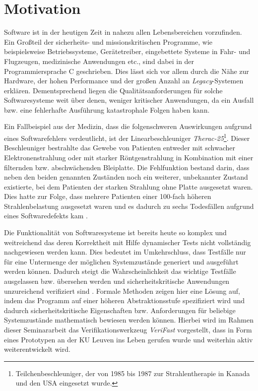 \section{Motivation}

Software ist in der heutigen Zeit in nahezu allen Lebensbereichen vorzufinden. Ein Großteil der sicherheits- und missionskritischen Programme, wie beispielsweise Betriebssysteme, Gerätetreiber, eingebettete Systeme in Fahr- und Flugzeugen, medizinische Anwendungen etc.,  sind dabei in der Programmiersprache C geschrieben. Dies lässt sich vor allem durch die Nähe zur Hardware, der hohen Performance und der großen Anzahl an \emph{Legacy}-Systemen erklären. Dementsprechend liegen die Qualitätsanforderungen für solche Softwaresysteme weit über denen, weniger kritischer Anwendungen, da ein Ausfall bzw. eine fehlerhafte Ausführung katastrophale Folgen haben kann.

Ein Fallbeispiel aus der Medizin, dass die folgenschweren Auswirkungen aufgrund eines Softwarefehlers verdeutlicht, ist der Linearbeschleuniger \emph{Therac-25}\footnote{Teilchenbeschleuniger, der von 1985 bis 1987 zur Strahlentherapie in Kanada und den USA eingesetzt wurde.}. Dieser Beschleuniger bestrahlte das Gewebe von Patienten entweder mit schwacher Elektronenstrahlung oder mit starker Röntgenstrahlung in Kombination mit einer filternden bzw. abschwächenden Bleiplatte. Die Fehlfunktion bestand darin, dass neben den beiden genannten Zuständen noch ein weiterer, unbekannter Zustand existierte, bei dem Patienten der starken Strahlung ohne Platte ausgesetzt waren. Dies hatte zur Folge, dass mehrere Patienten einer 100-fach höheren Strahlenbelastung ausgesetzt waren und es dadurch zu sechs Todesfällen aufgrund eines Softwaredefekts kam \cite{Pfeifer2003}.

Die Funktionalität von Softwaresysteme ist bereits heute so komplex und weitreichend das deren Korrektheit mit Hilfe dynamischer Tests nicht vollständig nachgewiesen werden kann. Dies bedeutet im Umkehrschluss, dass Testfälle nur für eine Untermenge der möglichen Systemzustände generiert und ausgeführt werden können. Dadurch steigt die Wahrscheinlichkeit das wichtige Testfälle ausgelassen bzw. übersehen werden und sicherheitskritische Anwendungen unzureichend verifiziert sind \cite{Crocker2007}. Formale Methoden zeigen hier eine Lösung auf, indem das Programm auf einer höheren Abstraktionsstufe spezifiziert wird und dadurch sicherheitskritische Eigenschaften bzw. Anforderungen für beliebige Systemzustände mathematisch bewiesen werden können. Hierbei wird im Rahmen dieser Seminararbeit das Verifikationswerkzeug \emph{VeriFast} vorgestellt, dass in Form eines Prototypen an der KU Leuven ins Leben gerufen wurde und weiterhin aktiv weiterentwickelt wird.
